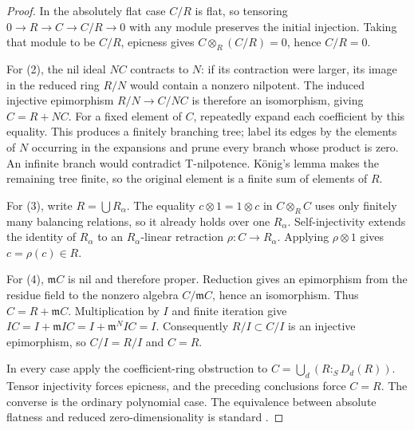 \begin{proof}
In the absolutely flat case $C/R$ is flat, so tensoring
$0\to R\to C\to C/R\to0$ with any module preserves the initial
injection. Taking that module to be $C/R$, epicness gives
$C\otimes_R(C/R)=0$, hence $C/R=0$.

For (2), the nil ideal $NC$ contracts to $N$: if its contraction
were larger, its image in the reduced ring $R/N$ would contain a
nonzero nilpotent. The induced injective epimorphism
$R/N\to C/NC$ is therefore an isomorphism, giving $C=R+NC$.
For a fixed element of $C$, repeatedly expand each coefficient by
this equality. This produces a finitely branching tree; label its
edges by the elements of $N$ occurring in the expansions and prune
every branch whose product is zero. An infinite branch would
contradict T-nilpotence. K\"onig's lemma makes the remaining tree
finite, so the original element is a finite sum of elements of $R$.

For (3), write $R=\bigcup R_\alpha$. The equality
$c\otimes1=1\otimes c$ in $C\otimes_R C$ uses only finitely many
balancing relations, so it already holds over one $R_\alpha$.
Self-injectivity extends the identity of $R_\alpha$ to an
$R_\alpha$-linear retraction $\rho:C\to R_\alpha$. Applying
$\rho\otimes1$ gives $c=\rho(c)\in R$.

For (4), $\mathfrak mC$ is nil and therefore proper. Reduction gives
an epimorphism from the residue field to the nonzero algebra
$C/\mathfrak mC$, hence an isomorphism. Thus $C=R+\mathfrak mC$.
Multiplication by $I$ and finite iteration give
$IC=I+\mathfrak mIC=I+\mathfrak m^NIC=I$. Consequently
$R/I\subset C/I$ is an injective epimorphism, so $C/I=R/I$ and
$C=R$.

In every case apply the coefficient-ring obstruction to
$C=\bigcup_d(R:_S D_d(R))$. Tensor injectivity forces epicness,
and the preceding conclusions force $C=R$. The converse is the
ordinary polynomial case. The equivalence between absolute
flatness and reduced zero-dimensionality is standard
\cite[Tag~092F]{StacksAbsolutelyFlat}.
\end{proof}

